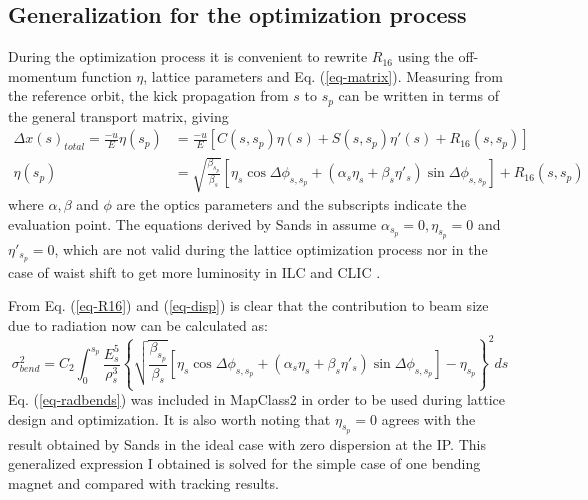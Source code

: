 \subsection{Generalization for the optimization process}\label{s:thebeamrad}
During the optimization process it is convenient to rewrite $R_{16}$ using the off-momentum function $\eta$, lattice parameters and Eq. (\ref{eq-matrix}). Measuring from the reference orbit, the kick propagation from $s$ to $s_p$ can be written in terms of the general transport matrix, giving
\begin{align}
\Delta x(s)_{total}=\frac{-u}{E}\eta(s_p) &= \frac{-u}{E} \left[C(s,s_p)\eta(s) + S(s,s_p)\eta'(s) + R_{16}(s,s_p)\right]\\
\eta(s_p) &= \sqrt{\frac{\beta_{s_p}}{\beta_s}}\left[\eta_s\cos\Delta\phi_{s,s_p}+(\alpha_s\eta_s+\beta_s\eta'_s)\sin\Delta\phi_{s,s_p}\right] + R_{16}(s,s_p)\label{eq-disp}
\end{align}
where $\alpha, \beta$ and $\phi$ are the optics parameters and the subscripts indicate the evaluation point. The equations derived by Sands in \cite{Sands} assume $\alpha_{s_p}=0, \eta_{s_p}=0$ and $\eta'_{s_p}=0$, which are not valid during the lattice optimization process nor in the case of waist shift to get more luminosity in ILC and CLIC \cite{PhysRevSTAB.16.041001}.\par
From Eq. (\ref{eq-R16}) and (\ref{eq-disp}) is clear that the contribution to beam size due to radiation now can be calculated as:
\begin{equation}
 \sigma_{bend}^2=C_2 \int_0^{s_p} \frac{E^5_s}{\rho^3_s}\left\{\sqrt{\frac{\beta_{s_p}}{\beta_s}}\left[\eta_s\cos\Delta\phi_{s,s_p}+(\alpha_s\eta_s+\beta_s\eta'_s)\sin\Delta\phi_{s,s_p}\right]-\eta_{s_p}\right\}^2ds\label{eq-radbends}
\end{equation}
Eq. (\ref{eq-radbends}) was included in MapClass2 in order to be used during lattice design and optimization. It is also worth noting that $\eta_{s_p}=0$ agrees with the result obtained by Sands in the ideal case with zero dispersion at the IP. This generalized expression I obtained is solved for the simple case of one bending magnet and compared with tracking results.

